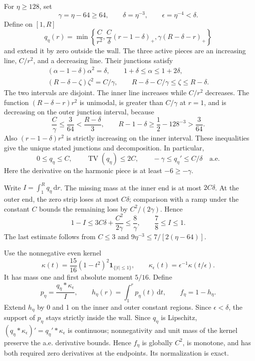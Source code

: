 \documentclass[11pt,a4paper]{article}
\newcommand{\dd}{\,\mathrm d}
\newcommand{\TV}{\operatorname{TV}}
\numberwithin{equation}{section}
\begin{document}
For \(\eta\ge128\), set
\[
 \gamma=\eta-64\ge64,\qquad \delta=\eta^{-3},\qquad
 \epsilon=\eta^{-4}<\delta .
\]
Define on \([1,R]\)
\begin{equation}\label{eq:raw-profile}
 q_\eta(r)=\min\left\{\frac C{r^2},
             \frac C\delta(r-1-\delta)_+,
             \gamma(R-\delta-r)_+\right\}
\end{equation}
and extend it by zero outside the wall. The three active pieces are an
increasing line, \(C/r^2\), and a decreasing line. Their junctions satisfy
\begin{equation}\label{eq:junctions}
 \begin{gathered}
 (\alpha-1-\delta)\alpha^2=\delta,\qquad
          1+\delta\le\alpha\le1+2\delta,\\
 (R-\delta-\zeta)\zeta^2=C/\gamma,\qquad
          R-\delta-C/\gamma\le\zeta\le R-\delta.
 \end{gathered}
\end{equation}
The two intervals are disjoint. The inner line increases while
\(C/r^2\) decreases. The function \((R-\delta-r)r^2\) is unimodal,
is greater than \(C/\gamma\) at \(r=1\), and is decreasing on the
outer junction interval, because
\[
 \frac C\gamma\le\frac3{64}<\frac{R-\delta}{3},\qquad
 R-1-\delta\ge\frac12-128^{-3}>\frac3{64}.
\]
Also \((r-1-\delta)r^2\) is strictly increasing on the inner interval.
These inequalities give the unique stated junctions and decomposition.
In particular,
\[
 0\le q_\eta\le C,\qquad \TV(q_\eta)\le2C,\qquad
       -\gamma\le q_\eta'\le C/\delta\quad\text{a.e.}
\]
Here the derivative on the harmonic piece is at least \(-6\ge-\gamma\).

Write \(I=\int_1^R q_\eta\dd r\).
The missing mass at the inner end is at most \(2C\delta\).
At the outer end, the zero strip loses at most \(C\delta\);
comparison with a ramp under the constant \(C\) bounds the remaining
loss by \(C^2/(2\gamma)\). Hence
\begin{equation}\label{eq:Ibound}
 1-I\le3C\delta+\frac{C^2}{2\gamma}\le\frac8\gamma,
 \qquad \frac78\le I\le1 .
\end{equation}
The last estimate follows from \(C\le3\) and
\(9\eta^{-3}\le 7/[2(\eta-64)]\).

Use the nonnegative even kernel
\[
 \kappa(t)=\frac{15}{16}(1-t^2)^2\mathbf1_{\{|t|\le1\}},
 \qquad \kappa_\epsilon(t)=\epsilon^{-1}\kappa(t/\epsilon).
\]
It has mass one and first absolute moment \(5/16\). Define
\begin{equation}\label{eq:smoothed-profile}
 p_\eta=\frac{q_\eta*\kappa_\epsilon}{I},\qquad
 h_\eta(r)=\int_1^r p_\eta(t)\dd t,\qquad f_\eta=1-h_\eta.
\end{equation}
Extend \(h_\eta\) by 0 and 1 on the inner and outer constant regions.
Since \(\epsilon<\delta\), the support of \(p_\eta\) stays strictly
inside the wall. Since \(q_\eta\) is Lipschitz,
\((q_\eta*\kappa_\epsilon)'=q_\eta'*\kappa_\epsilon\) is continuous;
nonnegativity and unit mass of the kernel preserve the a.e. derivative
bounds. Hence \(f_\eta\) is globally \(C^2\), is monotone, and has both required zero derivatives
at the endpoints. Its normalization is exact.
\end{document}
